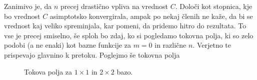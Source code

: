 \documentclass[a4paper]{article}
\begin{document}
Zanimivo je, da $n$ precej drastično vpliva na vrednost $C$. Določi kot stopnica, kje bo vrednost $C$ asimptotsko konvergirala, ampak 
po nekaj členih ne kaže, da bi se vrednost kaj veliko spreminjala, kar pomeni, da pridemo hitro do rezultata. To vse je precej smiselno, 
še sploh bo zdaj, ko si pogledamo tokovna polja, ki so zelo podobi (a ne enaki) kot bazne funkcije za $m=0$ in različne $n$. Verjetno 
te prispevajo glavnino k pretoku. Poglejmo še tokovna polja

\begin{figure}[H]
    \centering
    \caption{Tokova polja za $1\times1$ in $2\times2$ bazo.}
\end{figure}
\end{document}
